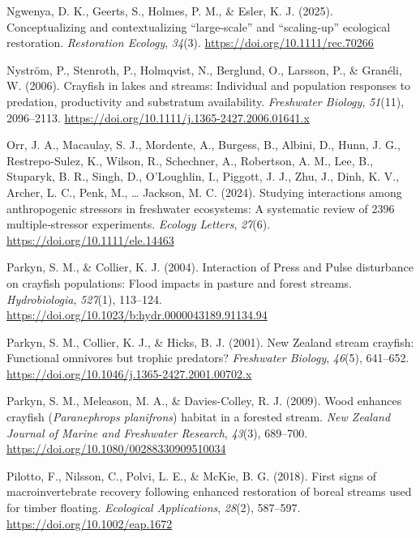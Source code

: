 \documentclass[
  letterpaper,
  DIV=11,
  numbers=noendperiod]{scrartcl}
\newlength{\cslhangindent}
\newenvironment{CSLReferences}[2] %
 {\begin{list}{}{%
  \setlength{\itemindent}{0pt}
  \setlength{\leftmargin}{0pt}
  \setlength{\parsep}{0pt}
  \ifodd #1
   \setlength{\leftmargin}{\cslhangindent}
   \setlength{\itemindent}{-1\cslhangindent}
  \fi
  \setlength{\itemsep}{#2\baselineskip}}}
 {\end{list}}
\begin{document}
\begin{CSLReferences}{1}{0}
Ngwenya, D. K., Geerts, S., Holmes, P. M., \& Esler, K. J. (2025).
Conceptualizing and contextualizing {``large‐scale''} and
{``scaling‐up''} ecological restoration. \emph{Restoration Ecology},
\emph{34}(3). \url{https://doi.org/10.1111/rec.70266}

Nyström, P., Stenroth, P., Holmqvist, N., Berglund, O., Larsson, P., \&
Granéli, W. (2006). Crayfish in lakes and streams: Individual and
population responses to predation, productivity and substratum
availability. \emph{Freshwater Biology}, \emph{51}(11), 2096--2113.
\url{https://doi.org/10.1111/j.1365-2427.2006.01641.x}

Orr, J. A., Macaulay, S. J., Mordente, A., Burgess, B., Albini, D.,
Hunn, J. G., Restrepo‐Sulez, K., Wilson, R., Schechner, A., Robertson,
A. M., Lee, B., Stuparyk, B. R., Singh, D., O'Loughlin, I., Piggott, J.
J., Zhu, J., Dinh, K. V., Archer, L. C., Penk, M., \ldots{} Jackson, M.
C. (2024). Studying interactions among anthropogenic stressors in
freshwater ecosystems: A systematic review of 2396 multiple‐stressor
experiments. \emph{Ecology Letters}, \emph{27}(6).
\url{https://doi.org/10.1111/ele.14463}

Parkyn, S. M., \& Collier, K. J. (2004). Interaction of {Press} and
{Pulse} disturbance on crayfish populations: Flood impacts in pasture
and forest streams. \emph{Hydrobiologia}, \emph{527}(1), 113--124.
\url{https://doi.org/10.1023/b:hydr.0000043189.91134.94}

Parkyn, S. M., Collier, K. J., \& Hicks, B. J. (2001). {New Zealand}
stream crayfish: Functional omnivores but trophic predators?
\emph{Freshwater Biology}, \emph{46}(5), 641--652.
\url{https://doi.org/10.1046/j.1365-2427.2001.00702.x}

Parkyn, S. M., Meleason, M. A., \& Davies-Colley, R. J. (2009). Wood
enhances crayfish ({\emph{Paranephrops planifrons}}) habitat in a
forested stream. \emph{New Zealand Journal of Marine and Freshwater
Research}, \emph{43}(3), 689--700.
\url{https://doi.org/10.1080/00288330909510034}

Pilotto, F., Nilsson, C., Polvi, L. E., \& McKie, B. G. (2018). First
signs of macroinvertebrate recovery following enhanced restoration of
boreal streams used for timber floating. \emph{Ecological Applications},
\emph{28}(2), 587--597. \url{https://doi.org/10.1002/eap.1672}


\end{CSLReferences}
\end{document}
